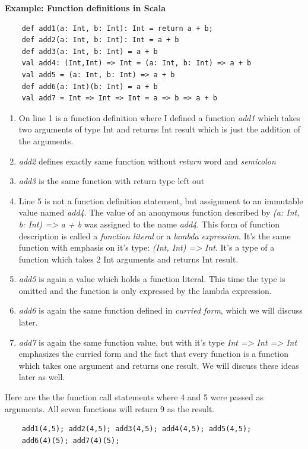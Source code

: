 \documentclass[12pt,twoside,a4paper]{report}
\begin{document}
\textbf{Example: Function definitions in Scala}

\begin{lstlisting}
	def add1(a: Int, b: Int): Int = return a + b;
	def add2(a: Int, b: Int): Int = a + b
	def add3(a: Int, b: Int) = a + b
	val add4: (Int,Int) => Int = (a: Int, b: Int) => a + b
	val add5 = (a: Int, b: Int) => a + b
	def add6(a: Int)(b: Int) = a + b
	val add7 = Int => Int => Int = a => b => a + b
\end{lstlisting}

\begin{enumerate}\itemsep1pt \parskip0pt 
\item On line 1 is a function definition where I defined a function \emph{add1} which takes two arguments of type Int and returns Int result which is just the addition of the arguments.
\item \emph{add2} defines exactly same function without \emph{return} word and \emph{semicolon}
\item \emph{add3} is the same function with return type left out
\item Line 5 is not a function definition statement, but assignment to an  
immutable value named \emph{add4}. The value of an anonymous function described by \emph{(a: Int, b: Int) => a + b} was assigned to the name \emph{add4}. This form of function description is called a \emph{function literal} or a \emph{lambda expression}. It's the same function with emphasis on it's type: \emph{(Int, Int) => Int}. It's a type of a function which takes 2 Int arguments and returns Int result. 
\item \emph{add5} is again a value which holds a function literal. This time the type is omitted and the function is only expressed by the lambda expression.
\item \emph{add6} is again the same function defined in \emph{curried form}, which we will discuss later.
\item \emph{add7} is again the same function value, but with it's type \emph{Int => Int => Int} emphasizes the curried form and the fact that every function is a function which takes one argument and returns one result. We will discuss these ideas later as well.
\end{enumerate}

Here are the the function call statements where 4 and 5 were passed as arguments. All seven functions will return 9 as the result. 
\begin{lstlisting}
	add1(4,5); add2(4,5); add3(4,5); add4(4,5);	add5(4,5); 
	add6(4)(5);	add7(4)(5);
\end{lstlisting}
\end{document}
